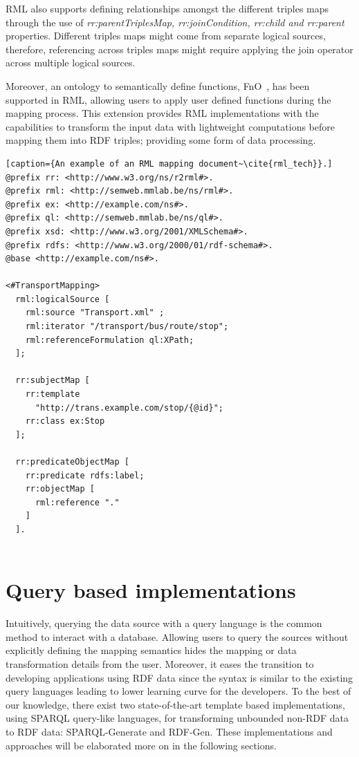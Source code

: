 RML also supports defining relationships amongst the different 
triples maps through the use of \textit{rr:parentTriplesMap, rr:joinCondition, rr:child and rr:parent}
properties. Different triples maps might come from separate logical sources, therefore, 
referencing across triples maps might require applying the join operator across multiple 
logical sources. 

Moreover, an ontology to semantically define functions, FnO~\cite{fno_ben}, has been supported 
in RML, allowing users to apply user defined functions during the mapping process. This 
extension provides RML implementations with the capabilities to transform the input data with 
lightweight computations before mapping them into RDF triples; providing some form of 
data processing. 

\begin{lstlisting}[caption={An example of an RML mapping document~\cite{rml_tech}}.]
@prefix rr: <http://www.w3.org/ns/r2rml#>.
@prefix rml: <http://semweb.mmlab.be/ns/rml#>.
@prefix ex: <http://example.com/ns#>.
@prefix ql: <http://semweb.mmlab.be/ns/ql#>.
@prefix xsd: <http://www.w3.org/2001/XMLSchema#>.
@prefix rdfs: <http://www.w3.org/2000/01/rdf-schema#>.
@base <http://example.com/ns#>.

<#TransportMapping>
  rml:logicalSource [
    rml:source "Transport.xml" ;
    rml:iterator "/transport/bus/route/stop";
    rml:referenceFormulation ql:XPath;
  ];

  rr:subjectMap [
    rr:template
      "http://trans.example.com/stop/{@id}";
    rr:class ex:Stop
  ];

  rr:predicateObjectMap [
    rr:predicate rdfs:label;
    rr:objectMap [
      rml:reference "."
    ]
  ].
    
\end{lstlisting}

\section{Query based implementations}
\label{sec:query_based_implementations}

Intuitively, querying the data source with a 
query language is the common method to interact 
with a database. Allowing users to query the sources without explicitly 
defining the mapping semantics hides the mapping or data transformation details from the user. 
Moreover, it eases the transition to developing applications using RDF data since the syntax is 
similar to the existing query languages leading to lower learning curve for the developers.
To the best of our knowledge, there exist two state-of-the-art 
template based implementations, using SPARQL query-like languages, for transforming 
unbounded non-RDF data to RDF data: SPARQL-Generate and RDF-Gen.
These implementations and approaches will be elaborated more on in the following sections.


